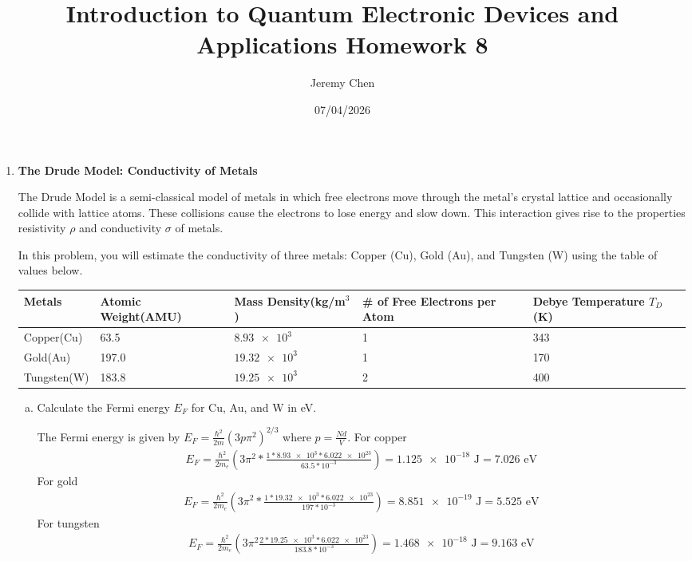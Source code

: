 \documentclass[10pt,letterpaper]{article}
\title{Introduction to Quantum Electronic Devices and Applications Homework 8}
\author{Jeremy Chen}
\date{07/04/2026}
\begin{document}
	\maketitle

\begin{enumerate}

\item \textbf{The Drude Model: Conductivity of Metals}

The Drude Model is a semi-classical model of metals in which free electrons move through the metal’s crystal lattice and occasionally collide with lattice atoms. These collisions cause the electrons to lose energy and slow down. This interaction gives rise to the properties resistivity $\rho$ and conductivity $\sigma$ of metals.

In this problem, you will estimate the conductivity of three metals: Copper (Cu), Gold (Au), and Tungsten (W) using the table of values below.

\begin{table}[h]
\centering
\begin{tabular}{|P{3cm}|P{3cm}|P{3cm}|P{3cm}|P{3cm}|}
\hline
\textbf{Metals} & \textbf{Atomic Weight(AMU)} & \textbf{Mass Density(kg/m$^{3}$)} & \textbf{\# of Free Electrons per Atom} & \textbf{Debye Temperature $T_{D}$ (K)} \\
\hline
Copper(Cu) & 63.5 & $\num{8.93e3}$ & 1 & 343 \\
\hline
Gold(Au) & 197.0 & $\num{19.32e3}$ & 1 & 170 \\
\hline
Tungsten(W) & 183.8 & $\num{19.25e3}$ & 2 & 400 \\
\hline
\end{tabular}
\end{table}

\begin{enumerate}[a)]

\item Calculate the Fermi energy $E_{F}$ for Cu, Au, and W in eV.

\color{violet}
The Fermi energy is given by $E_{F} = \frac{\hbar^{2}}{2m}(3p\pi^{2})^{2/3}$ where $p = \frac{Nd}{V}$. For copper
\begin{gather*}
E_{F} = \frac{\hbar^{2}}{2m_{e}} \left( 3\pi^{2} * \frac{1 * \num{8.93e3} * \num{6.022e23}}{63.5 * 10^{-3}} \right) = \num{1.125e-18} \text{ J}= 7.026\text{ eV}
\end{gather*}
For gold
\begin{gather*}
E_{F} = \frac{\hbar^{2}}{2m_{e}} \left( 3\pi^{2} * \frac{1 * \num{19.32e3} * \num{6.022e23}}{197 * 10^{-3}} \right) = \num{8.851e-19}\text{ J} = 5.525\text{ eV}
\end{gather*}
For tungsten
\begin{gather*}
E_{F} = \frac{\hbar^{2}}{2m_{e}} \left( 3\pi^{2}\frac{2 * \num{19.25e3} * \num{6.022e23}}{183.8* 10^{-3}} \right) = \num{1.468e-18}\text{ J} = 9.163\text{ eV}
\end{gather*}
\color{black}


\end{enumerate}
\end{enumerate}
\end{document}
